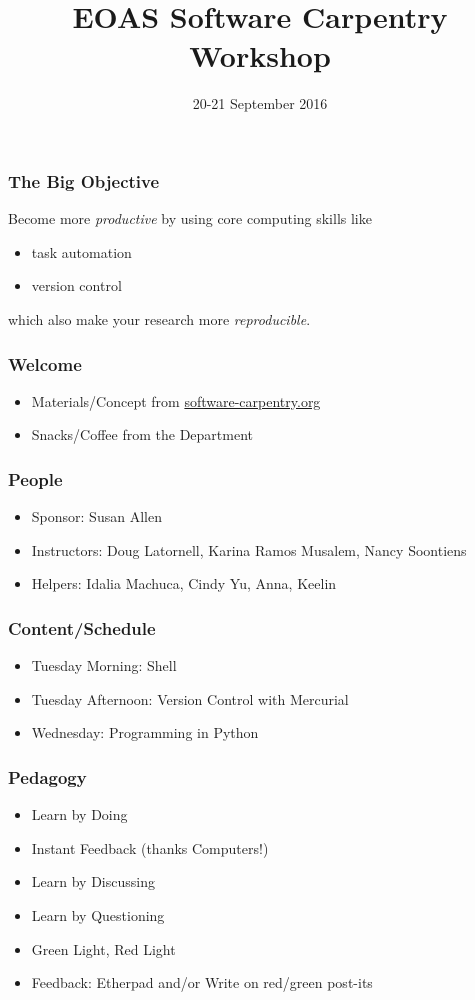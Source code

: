 \documentclass{beamer}
\title[]{EOAS Software Carpentry Workshop}
\subtitle[]{}
\date[]{20-21 September 2016}
\begin{document}




\begin{frame}[plain]
  \titlepage
\end{frame}


\begin{frame}
  \frametitle{The Big Objective}
  Become more {\em productive} by using core computing skills like
  \begin{itemize}
    \item task automation
    \item version control
  \end{itemize}
  which also make your research more {\em reproducible}.
\end{frame}


\begin{frame}
  \frametitle{Welcome}
  \begin{itemize}
    \item Materials/Concept from \href{http://software-carpentry.org/}{software-carpentry.org}
    \item Snacks/Coffee from the Department
  \end{itemize}
\end{frame}


\begin{frame}
  \frametitle{People}
  \begin{itemize}
    \item Sponsor: Susan Allen
    \item Instructors: Doug Latornell, Karina Ramos Musalem, Nancy Soontiens
    \item Helpers: Idalia Machuca, Cindy Yu, Anna, Keelin
  \end{itemize}
\end{frame}


\begin{frame}
  \frametitle{Content/Schedule}
  \begin{itemize}
    \item Tuesday Morning: Shell
    \item Tuesday Afternoon: Version Control with Mercurial
    \item Wednesday: Programming in Python
  \end{itemize}
\end{frame}


\begin{frame}
  \frametitle{Pedagogy}
  \begin{itemize}
    \item Learn by Doing
    \item Instant Feedback (thanks Computers!)
    \item Learn by Discussing
    \item Learn by Questioning
    \item Green Light, Red Light
    \item Feedback: Etherpad and/or Write on red/green post-its
  \end{itemize}
\end{frame}
\end{document}
